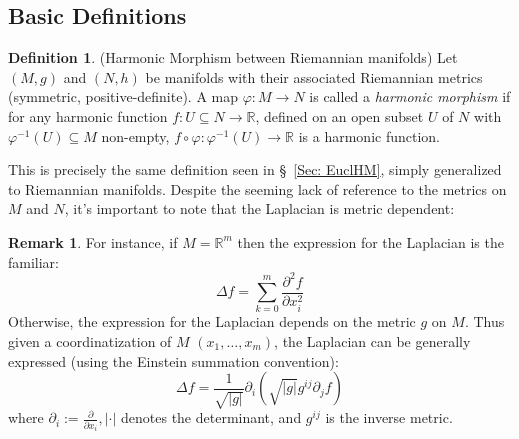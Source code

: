 \documentclass[12pt]{article}
\theoremstyle{definition}
\newtheorem{definition}{Definition}[section]
\newtheorem{remark}{Remark}[subsection]
\numberwithin{equation}{subsection}
\begin{document}
\subsection{Basic Definitions}
\begin{definition} \label{def: RiemHM}
(Harmonic Morphism between Riemannian manifolds) Let $(M,g)$ and $(N,h)$ be manifolds with their associated Riemannian metrics (symmetric, positive-definite). A map $\varphi: M \rightarrow N$ is called a \textit{harmonic morphism} if for any harmonic function $f: U\subseteq N \rightarrow \mathbb{R}$, defined on an open subset $U$ of $N$ with $\varphi^{-1}(U) \subseteq M$ non-empty, $f \circ \varphi: \varphi^{-1}(U) \rightarrow \mathbb{R}$ is a harmonic function.
\end{definition}
This is precisely the same definition seen in \S~\ref{Sec: EuclHM}, simply generalized to Riemannian manifolds. Despite the seeming lack of reference to the metrics on $M$ and $N$, it's important to note that the Laplacian is metric dependent:
\begin{remark}\label{Remark: RiemLapl}
For instance, if $M = \mathbb{R}^m$ then the expression for the Laplacian is the familiar:
$$
\Delta f = \sum_{k=0}^{m} \frac{\partial^2f}{\partial x_i^2}
$$
Otherwise, the expression for the Laplacian depends on the metric $g$ on $M$. Thus given a coordinatization of $M$ $(x_1, \dots , x_m)$, the Laplacian can be generally expressed (using the Einstein summation convention):
$$
\Delta f = \frac{1}{\sqrt{|g|}}\partial_i\left(\sqrt{|g|}g^{ij}\partial_j f\right)
$$
where $\partial_i :=\frac{\partial}{\partial x_i}, | \cdot |$ denotes the determinant, and $g^{ij}$ is the inverse metric.
\end{remark}
\end{document}
